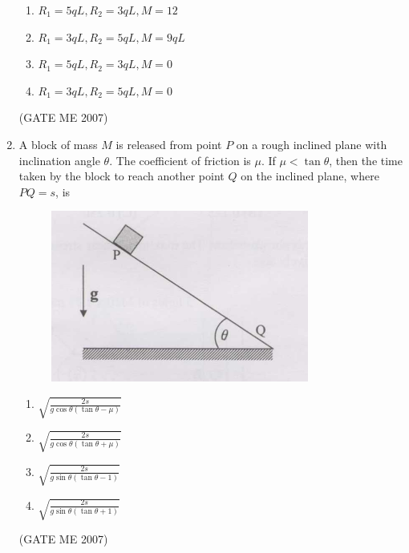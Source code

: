 \documentclass[journal]{IEEEtran}
\begin{document}
\begin{enumerate}
\begin{multicols}{2}
\begin{enumerate}
\item $ R_1 = 5qL, R_2 = 3qL, M = 12 $
\item $ R_1 = 3qL, R_2 = 5qL, M = 9qL $
\item $ R_1 = 5qL, R_2 = 3qL, M = 0 $
\item $ R_1 = 3qL, R_2 = 5qL, M = 0 $
\end{enumerate}
\end{multicols}
\hfill (GATE ME 2007)

\item A block of mass $ M $ is released from point $ P $ on a rough inclined plane with inclination angle $ \theta $. The coefficient of friction is $ \mu $. If $ \mu < \tan \theta $, then the time taken by the block to reach another point $ Q $ on the inclined plane, where $ PQ = s $, is

\begin{figure}[H]
    \centering
    \includegraphics[width=0.8\textwidth]{Fig 3.png}
    \caption{}
    \label{fig:question43}
\end{figure}

\begin{multicols}{2}
\begin{enumerate}
\item $ \sqrt{\frac{2s}{g \cos \theta (\tan \theta - \mu)}} $
\item $ \sqrt{\frac{2s}{g \cos \theta (\tan \theta + \mu)}} $
\item $ \sqrt{\frac{2s}{g \sin \theta (\tan \theta - 1)}} $
\item $ \sqrt{\frac{2s}{g \sin \theta (\tan \theta + 1)}} $
\end{enumerate}
\end{multicols}
\hfill (GATE ME 2007)


\end{enumerate}
\end{document}
